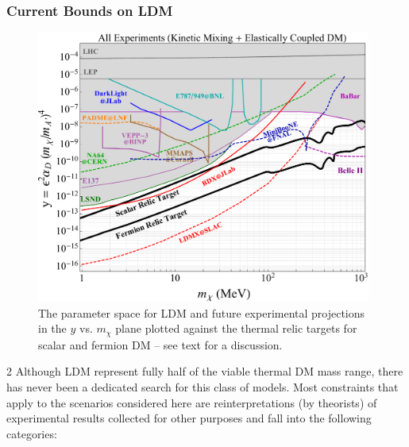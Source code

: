 \subsubsection{Current Bounds on LDM}


\begin{figure}[t!]
\center
\includegraphics[width=11cm]{sections/goals/everything.pdf}
\caption{ The parameter space for LDM and future experimental projections in the $y$ vs. $m_\chi$ plane plotted against
 the thermal relic targets for scalar and fermion DM -- see text for a discussion. }
\label{fig:mainplot}
\end{figure}

2
Although LDM represent fully half of the viable thermal DM mass range, there has never been a dedicated search
for this class of models. Most constraints that apply to the scenarios considered here are reinterpretations (by theorists)
of experimental results collected for other purposes and fall into the following categories:

